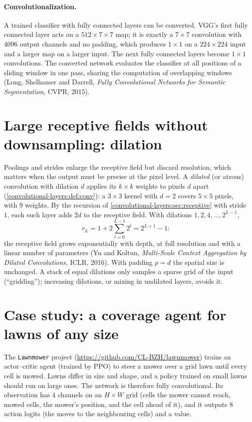 \begin{notechapter}
\paragraph{Convolutionalization.} A trained classifier with fully connected layers can be
converted. VGG's first fully connected layer acts on a $512\times7\times7$ map; it is exactly a $7\times7$
convolution with $4096$ output channels and no padding, which produces $1\times1$ on a $224\times224$ input
and a larger map on a larger input. The next fully connected layers become $1\times1$ convolutions.
The converted network evaluates the classifier at all positions of a sliding window in
one pass, sharing the computation of overlapping windows (Long, Shelhamer and Darrell,
\emph{Fully Convolutional Networks for Semantic Segmentation}, CVPR, 2015).

\section{Large receptive fields without downsampling: dilation}\label{fully-convolutional:sec:dilation}

Poolings and strides enlarge the receptive field but discard resolution, which matters
when the output must be precise at the pixel level. A \emph{dilated} (or atrous) convolution with
dilation $d$ applies its $k\times k$ weights to pixels $d$ apart (\cref{convolutional-layers:def:conv}): a $3\times3$ kernel
with $d = 2$ covers $5\times5$ pixels, with $9$ weights. By the recursion of
\cref{convolutional-layers:sec:receptive} with stride $1$, each such layer adds $2d$ to the receptive
field. With dilations $1, 2, 4,\dots,2^{L-1}$,
\[
  r_L = 1 + 2\sum_{l=0}^{L-1}2^l = 2^{L+1} - 1:
\]
the receptive field grows exponentially with depth, at full resolution and with a linear
number of parameters (Yu and Koltun, \emph{Multi-Scale Context Aggregation by Dilated
Convolutions}, ICLR, 2016). With padding $p = d$ the spatial size is unchanged. A stack of
equal dilations only samples a sparse grid of the input (``gridding''); increasing dilations,
or mixing in undilated layers, avoids it.

\section{Case study: a coverage agent for lawns of any size}\label{fully-convolutional:sec:lawnmower}

The \texttt{Lawnmower} project (\url{https://github.com/CL-BZH/lawnmower}) trains an
actor--critic agent (trained by PPO) to steer a mower over a grid lawn until every cell is
mowed. Lawns differ in size and shape, and a policy trained on small lawns should run on
large ones. The network is therefore fully convolutional. Its observation has $4$ channels
on an $H\times W$ grid (cells the mower cannot reach, mowed cells, the mower's position, and the cell
ahead of it), and it outputs $8$ action logits (the moves to the neighbouring cells) and a value.


\end{notechapter}
